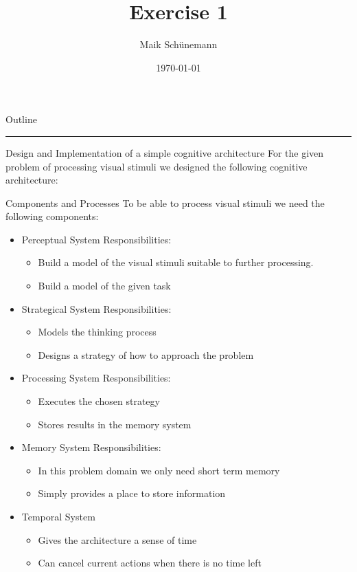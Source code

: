 \documentclass[presentation]{beamer}
\author{Maik Schünemann}
\date{\today}
\title{Exercise 1}
\begin{document}
\maketitle
\begin{frame}{Outline}
\tableofcontents
\end{frame}


\rule{\linewidth}{0.5pt}
\begin{frame}[label=sec-1]{Design and Implementation of a simple cognitive architecture}
For the given problem of processing visual stimuli 
we designed the following cognitive architecture:
\begin{block}{Components and Processes}
To be able to process visual stimuli we need the following components:
\begin{itemize}
\item Perceptual System
Responsibilities:
\begin{itemize}
\item Build a model of the visual stimuli suitable to further processing.
\item Build a model of the given task
\end{itemize}
\item Strategical System
Responsibilities:
\begin{itemize}
\item Models the thinking process
\item Designs a strategy of how to approach the problem
\end{itemize}
\item Processing System
Responsibilities:
\begin{itemize}
\item Executes the chosen strategy
\item Stores results in the memory system
\end{itemize}
\item Memory System
Responsibilities:
\begin{itemize}
\item In this problem domain we only need short term memory
\item Simply provides a place to store information
\end{itemize}
\item Temporal System
\begin{itemize}
\item Gives the architecture a sense of time
\item Can cancel current actions when there is no time left
\end{itemize}

\end{itemize}
\end{block}
\end{frame}
\end{document}

